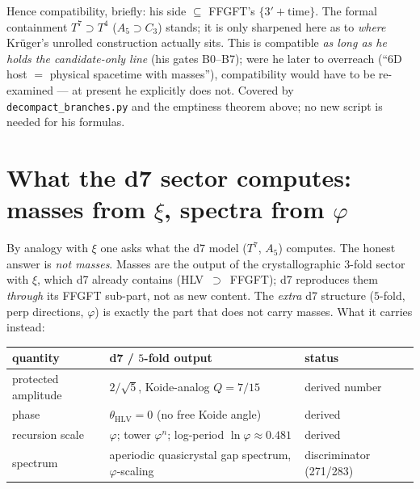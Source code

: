 Hence compatibility, briefly: his side $\subseteq$ FFGFT's $\{3'+\text{time}\}$. The formal
containment $T^7\supset T^4$ ($A_5\supset C_3$) stands; it is only sharpened here as to \emph{where}
Kr\"uger's unrolled construction actually sits. This is compatible \emph{as long as he holds the
candidate-only line} (his gates B0--B7); were he later to overreach (\enquote{$6$D host $=$ physical
spacetime with masses}), compatibility would have to be re-examined --- at present he explicitly
does not. Covered by \texttt{decompact\_branches.py} and the emptiness theorem above; no new script
is needed for his formulas.

\section{What the d7 sector computes: masses from $\xi$, spectra from $\varphi$}
By analogy with $\xi$ one asks what the d7 model ($T^7$, $A_5$) computes. The honest answer is
\emph{not masses}. Masses are the output of the crystallographic $3$-fold sector with $\xi$,
which d7 already contains (HLV~$\supset$~FFGFT); d7 reproduces them \emph{through} its FFGFT
sub-part, not as new content. The \emph{extra} d7 structure ($5$-fold, perp directions,
$\varphi$) is exactly the part that does not carry masses. What it carries instead:

\begin{center}\small\renewcommand{\arraystretch}{1.2}
\begin{tabular}{@{}p{3.2cm} p{5.6cm} p{2.8cm}@{}}
\toprule
quantity & d7 / $5$-fold output & status \\
\midrule
protected amplitude & $2/\sqrt5$, Koide-analog $Q=7/15$ & derived number \\
phase & $\theta_{\mathrm{HLV}}=0$ (no free Koide angle) & derived \\
recursion scale & $\varphi$; tower $\varphi^n$; log-period $\ln\varphi\approx0.481$ & derived \\
spectrum & aperiodic quasicrystal gap spectrum, $\varphi$-scaling & discriminator (271/283) \\
\bottomrule
\end{tabular}
\end{center}

